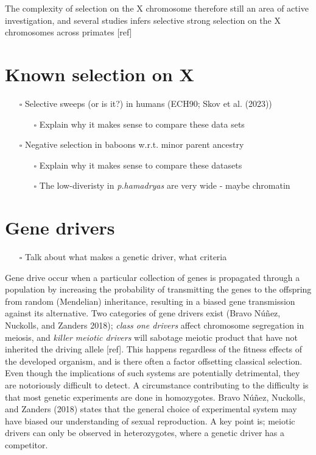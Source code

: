 \documentclass[
  11pt,
  a4paper,
]{scrbook}
\providecommand{\tightlist}{%
  \setlength{\itemsep}{0pt}\setlength{\parskip}{0pt}}\usepackage{longtable,booktabs,array}
\let\oldemph\emph
\renewcommand\emph[1]{\oldemph{\color{gray}#1}}
\begin{document}
The complexity of selection on the X chromosome therefore still an area
of active investigation, and several studies infers selective strong
selection on the X chromosomes across primates {[}ref{]}

\section{Known selection on X}\label{known-selection-on-x}

\begin{itemize}
\tightlist
\item[$\square$]
  Selective sweeps (or is it?) in humans (ECH90; Skov et al. (2023))

  \begin{itemize}
  \tightlist
  \item[$\square$]
    Explain why it makes sense to compare these data sets
  \end{itemize}
\item[$\square$]
  Negative selection in baboons w.r.t. minor parent ancestry

  \begin{itemize}
  \tightlist
  \item[$\square$]
    Explain why it makes sense to compare these datasets
  \item[$\square$]
    The low-diveristy in \emph{p.hamadryas} are very wide - maybe
    chromatin
  \end{itemize}
\end{itemize}

\section{Gene drivers}\label{gene-drivers}

\begin{itemize}
\tightlist
\item[$\square$]
  Talk about what makes a genetic driver, what criteria
\end{itemize}

Gene drive occur when a particular collection of genes is propagated
through a population by increasing the probability of transmitting the
genes to the offspring from random (Mendelian) inheritance, resulting in
a biased gene transmission against its alternative. Two categories of
gene drivers exist (Bravo Núñez, Nuckolls, and Zanders 2018);
\emph{class one drivers} affect chromosome segregation in meiosis, and
\emph{killer meiotic drivers} will sabotage meiotic product that have
not inherited the driving allele {[}ref{]}. This happens regardless of
the fitness effects of the developed organism, and is there often a
factor offsetting classical selection. Even though the implications of
such systems are potentially detrimental, they are notoriously difficult
to detect. A circumstance contributing to the difficulty is that most
genetic experiments are done in homozygotes. Bravo Núñez, Nuckolls, and
Zanders (2018) states that the general choice of experimental system may
have biased our understanding of sexual reproduction. A key point is;
meiotic drivers can only be observed in heterozygotes, where a genetic
driver has a competitor.
\end{document}
